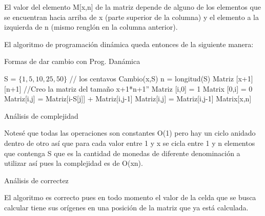 \documentclass[9pt,spanish]{article}
\numberwithin{equation}{section}
\begin{document}
El valor del elemento M[x,n] de la matriz depende de alguno de los elementos que se encuentran hacia arriba de x (parte superior de la columna) y el elemento a la izquierda de n (mismo renglón en la columna anterior).

El algoritmo de programación dinámica queda entonces de la siguiente manera:

\begin{algorithm}[H]
	\caption{Formas de dar cambio con Prog. Danámica }
	\begin{algorithmic}[1]
	\State S = $\{1,5,10,25,50\}$ // los centavos
	\State Cambio(x,S)
	\State n = longitud(S)
	\State Matriz [x+1][n+1] //Creo la matriz del tamaño x+1*n+1”
	\State Matriz [i,0] = 1
	\EndFor
	\State Matrix [0,i] = 0
	\EndFor
	\State Matriz[i,j] = Matriz[i-S[j]] + Matriz[i,j-1]
	\Else
	\State Matriz[i,j] = Matriz[i,j-1]
	\EndIf	
	\EndFor
	\EndFor
	\State
	\Return Matrix[x,n]
	\end{algorithmic}
\end{algorithm}

Análisis de complejidad

Notesé que todas las operaciones son constantes O(1) pero hay un ciclo anidado dentro de otro así que para cada valor entre 1 y x se cicla entre 1 y n elementos que contenga S que es la cantidad de monedas de diferente denominación a utilizar así pues la complejidad es de O(xn).

Análisis de correctez

El algoritmo es correcto pues en todo momento el valor de la celda que se busca calcular tiene sus orígenes en una posición de la matriz que ya está calculada.
\end{document}
